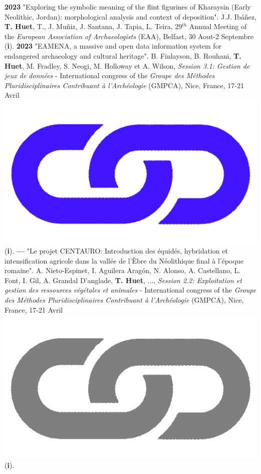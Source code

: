 \documentclass{article}
\begin{document}
{\smallbreak
\textbf{2023 }"Exploring the symbolic meaning of the flint figurines of Kharaysin (Early Neolithic, Jordan): morphological analysis and context of deposition". J.J. Ibáñez, \textbf{T. Huet}, T., J. Muñiz, J. Santana, J. Tapia, L. Teira, 29${}^{th}$ Annual Meeting of the \textit{European Association of Archaeologists} (EAA), Belfast, 30 Aout-2 Septembre (\textbf{i}).
\smallbreak
\textbf{2023 }"EAMENA, a massive and open data information system for endangered archaeology and cultural heritage". B. Finlayson, B. Rouhani, \textbf{T. Huet}, M. Fradley, S. Neogi, M. Holloway et A. Wilson, \textit{Session 3.1: Gestion de jeux de données} - International congress of the \textit{Groupe des Méthodes Pluridisciplinaires Contribuant à l'Archéologie} (GMPCA), Nice, France, 17-21 Avril \href{https://eamena-project.github.io/eamena-arches-dev/talks/2023-gmpca/pres/#/title-slide}{\includegraphics[scale=0.02]{link_darkblue.png}} (\textbf{i}).
\smallbreak
\textbf{--- }"Le projet CENTAURO: Introduction des équidés, hybridation et intensification agricole dans la vallée de l'Èbre du Néolithique final à l'époque romaine". A. Nieto-Espinet, I. Aguilera Aragón, N. Alonso, A. Castellano, L. Font, I. Gil, A. Grandal D'anglade, \textbf{T. Huet}, ..., \textit{Session 2.2: Exploitation et gestion des ressources végétales et animales} - International congress of the \textit{Groupe des Méthodes Pluridisciplinaires Contribuant à l'Archéologie} (GMPCA), Nice, France, 17-21 Avril \href{https://gmpca2023.sciencesconf.org/}{\includegraphics[scale=0.02]{link_grey.png}} (\textbf{i}).
}
\end{document}
